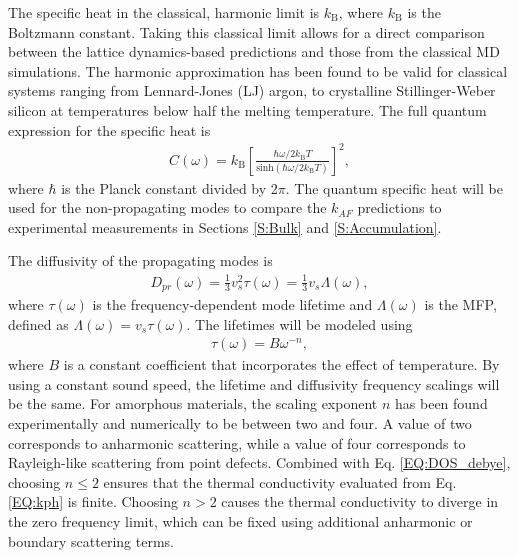 \documentclass[aps,prb,onecolumn,preprint,superscriptaddress,footinbib,amsmath,amssymb,floatfix]{revtex4}
\begin{document}
The specific heat in the classical, harmonic limit is 
$k_{\text{B}}$, where $k_{\text{B}}$ is the Boltzmann constant. 
Taking this classical limit allows for a direct 
comparison between the lattice dynamics-based 
predictions and those from the classical MD simulations. 
The harmonic approximation has been found to be valid 
for classical systems ranging from 
Lennard-Jones (LJ) argon,\cite{mcgaughey_quantitative_2004} 
to crystalline Stillinger-Weber silicon\cite{larkin_comparison_2012} 
at temperatures below half the melting temperature. 
The full quantum expression for the specific heat is
\cite{ziman_electrons_2001}
\begin{equation}\label{EQ:Cquantum}
\begin{split}
C(\omega) = k_{\text{B}}\left[\frac{\hbar\omega/2k_{\text{B}}T}
{\text{sinh}(\hbar\omega/2k_{\text{B}}T)}\right]^2,
\end{split}
\end{equation} 
where $\hbar$ is the Planck constant divided by 2$\pi$. 
The quantum specific heat will be used 
for the non-propagating modes to compare the $k_{AF}$ predictions 
to experimental measurements in Sections \ref{S:Bulk} 
and \ref{S:Accumulation}. 

The diffusivity of the propagating modes is    
\begin{equation}\label{EQ:Dtau}
\begin{split}
D_{pr}(\omega) = \frac{1}{3}v^2_s\tau(\omega) = \frac{1}{3}v_s \Lambda(\omega),
\end{split}
\end{equation}
where $\tau(\omega)$ is the frequency-dependent mode 
lifetime and $\Lambda(\omega)$ is the MFP, 
defined as $\Lambda(\omega) = v_{s} \tau(\omega)$. 
The lifetimes will be modeled using 
\begin{equation}\label{EQ:tauw2}
\begin{split}
\tau(\omega) = B \omega^{-n},
\end{split}
\end{equation}
where $B$ is a constant coefficient that incorporates 
the effect of temperature. 
By using a constant sound speed, the lifetime and diffusivity 
frequency scalings will be the same. 
For amorphous materials, the scaling exponent $n$ 
has been found experimentally and numerically to be 
between two and four.
\cite{feldman_numerical_1999,horbach_high_2001,
feldman_calculations_2002,masciovecchio_evidence_2006,
christie_vibrational_2007,liu_high_2009,
baldi_sound_2010,yang_anomalously_2010,baldi_elastic_2011,
he_heat_2011,baldi_emergence_2013}
A value of two corresponds to 
anharmonic scattering,\cite{callaway_model_1959} while a value of four 
corresponds to Rayleigh-like scattering from point defects.
\cite{klemens_scattering_1955}
Combined with Eq. \eqref{EQ:DOS_debye}, choosing $n\le2$ ensures 
that the thermal conductivity evaluated from Eq. \eqref{EQ:kph} is finite. 
Choosing $n>2$ causes the thermal conductivity to diverge 
in the zero frequency limit,   
which can be fixed using additional anharmonic
\cite{feldman_thermal_1993,feldman_numerical_1999} 
or boundary scattering terms.
\cite{cahill_thermal_1994,liu_high_2009,yang_anomalously_2010}
\end{document}
